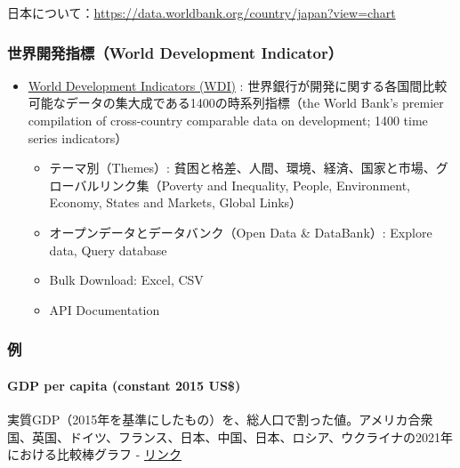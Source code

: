 \documentclass[
]{bxjsbook}
\providecommand{\tightlist}{%
  \setlength{\itemsep}{0pt}\setlength{\parskip}{0pt}}
\theoremstyle{definition}
\theoremstyle{definition}
\theoremstyle{definition}
\theoremstyle{definition}
\theoremstyle{remark}
\begin{document}
日本について：\url{https://data.worldbank.org/country/japan?view=chart}

\hypertarget{ux4e16ux754cux958bux767aux6307ux6a19world-development-indicator}{%
\subsubsection{世界開発指標（World Development Indicator）}\label{ux4e16ux754cux958bux767aux6307ux6a19world-development-indicator}}

\begin{itemize}
\tightlist
\item
  \href{https://datatopics.worldbank.org/world-development-indicators/}{World Development Indicators (WDI)} : 世界銀行が開発に関する各国間比較可能なデータの集大成である1400の時系列指標（the World Bank's premier compilation of cross-country comparable data on development; 1400 time series indicators）

  \begin{itemize}
  \tightlist
  \item
    テーマ別（Themes）: 貧困と格差、人間、環境、経済、国家と市場、グローバルリンク集（Poverty and Inequality, People, Environment, Economy, States and Markets, Global Links）
  \item
    オープンデータとデータバンク（Open Data \& DataBank）: Explore data, Query database
  \item
    Bulk Download: Excel, CSV
  \item
    API Documentation
  \end{itemize}
\end{itemize}

\hypertarget{ux4f8b}{%
\subsubsection{例}\label{ux4f8b}}

\hypertarget{gdp-per-capita-constant-2015-us}{%
\paragraph{GDP per capita (constant 2015 US\$)}\label{gdp-per-capita-constant-2015-us}}

実質GDP（2015年を基準にしたもの）を、総人口で割った値。アメリカ合衆国、英国、ドイツ、フランス、日本、中国、日本、ロシア、ウクライナの2021年における比較棒グラフ - \href{https://data.worldbank.org/indicator/NY.GDP.PCAP.KD?locations=JP-GB-RU-FR-CN-US-UA-DE\&start=2021\&end=2021\&view=bar}{リンク}
\end{document}

